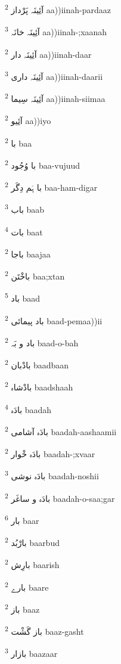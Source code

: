 \documentclass[12pt]{article}
\begin{document}
\begin{multicols}{5}
{\ur آئِینَہ پَرْداز}   \textsuperscript{2} aa))iinah-pardaaz

{\ur آئِینَہ خانَہ}   \textsuperscript{3} aa))iinah-;xaanah

{\ur آئِینَہ دار}   \textsuperscript{2} aa))iinah-daar

{\ur آئِینَہ داری}   \textsuperscript{3} aa))iinah-daarii

{\ur آئِینَہ سِیما}   \textsuperscript{2} aa))iinah-siimaa

{\ur آئِیو}   \textsuperscript{2} aa))iyo

{\ur با}   \textsuperscript{2} baa

{\ur با وُجُود}   \textsuperscript{2} baa-vujuud

{\ur با ہَم دِگَر}   \textsuperscript{2} baa-ham-digar

{\ur باب}   \textsuperscript{3} baab

{\ur بات}   \textsuperscript{4} baat

{\ur باجا}   \textsuperscript{2} baajaa

{\ur باخْتَن}   \textsuperscript{2} baa;xtan

{\ur باد}   \textsuperscript{5} baad

{\ur باد پیمائی}   \textsuperscript{2} baad-pemaa))ii

{\ur باد و بَہ}   \textsuperscript{2} baad-o-bah

{\ur بادْبان}   \textsuperscript{2} baadbaan

{\ur بادْشاہ}   \textsuperscript{2} baadshaah

{\ur بادَہ}   \textsuperscript{4} baadah

{\ur بادَہ آشامی}   \textsuperscript{2} baadah-aashaamii

{\ur بادَہ خْوار}   \textsuperscript{2} baadah-;xvaar

{\ur بادَہ نوشی}   \textsuperscript{3} baadah-noshii

{\ur بادَہ و ساغَر}   \textsuperscript{2} baadah-o-saa;gar

{\ur بار}   \textsuperscript{6} baar

{\ur بارْبُد}   \textsuperscript{2} baarbud

{\ur بارِش}   \textsuperscript{2} baarish

{\ur بارے}   \textsuperscript{2} baare

{\ur باز}   \textsuperscript{2} baaz

{\ur باز گَشْت}   \textsuperscript{2} baaz-gasht

{\ur بازار}   \textsuperscript{3} baazaar


\end{multicols}
\end{document}
